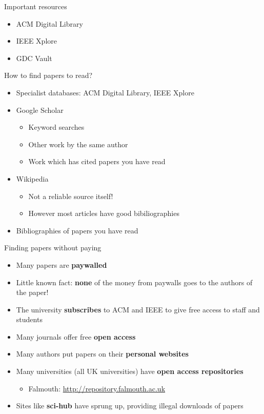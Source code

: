 \begin{frame}{Important resources}
	\begin{itemize}
        \pause\item ACM Digital Library
		\pause\item IEEE Xplore
		\pause\item GDC Vault
	\end{itemize}
\end{frame}

\begin{frame}{How to find papers to read?}
	\begin{itemize}
		\pause\item Specialist databases: ACM Digital Library, IEEE Xplore
		\pause\item Google Scholar
		    \begin{itemize}
		        \pause\item Keyword searches
		        \pause\item Other work by the same author
		        \pause\item Work which has cited papers you have read
		    \end{itemize}
		\pause\item Wikipedia
		    \begin{itemize}
		        \pause\item Not a reliable source itself!
		        \pause\item However most articles have good bibiliographies
		    \end{itemize}
		\pause\item Bibliographies of papers you have read
	\end{itemize}
\end{frame}

\begin{frame}{Finding papers without paying}
	\begin{itemize}
		\pause\item Many papers are \textbf{paywalled}
		\pause\item Little known fact: \textbf{none} of the money from paywalls goes to the authors of the paper!
		\pause\item The university \textbf{subscribes} to ACM and IEEE to give free access to staff and students
		\pause\item Many journals offer free \textbf{open access}
		\pause\item Many authors put papers on their \textbf{personal websites}
		\pause\item Many universities (all UK universities) have \textbf{open access repositories}
			\begin{itemize}
				\pause\item Falmouth: \url{http://repository.falmouth.ac.uk}
			\end{itemize}
		\pause\item Sites like \textbf{sci-hub} have sprung up, providing illegal downloads of papers
	\end{itemize}
\end{frame}

